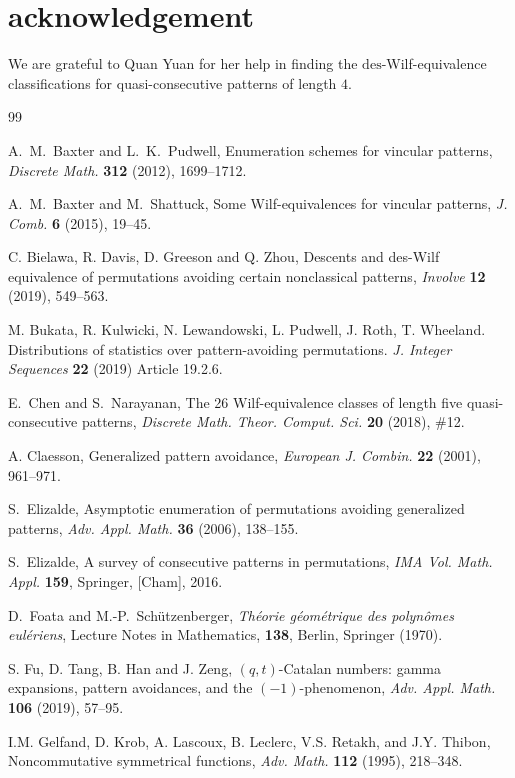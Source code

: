 \documentclass[11pt,reqno]{amsart}
\numberwithin{equation}{section}
\theoremstyle{plain}
\theoremstyle{definition}
\def\des{\mathrm{des}}
\begin{document}
\section*{acknowledgement}
We are grateful to Quan Yuan for her help in finding the $\des$-Wilf-equivalence classifications
for quasi-consecutive patterns of length $4$. 


\begin{thebibliography}{99}


     A.~M.~Baxter and L.~K.~Pudwell, Enumeration schemes for vincular patterns, {\em Discrete Math.} {\bf312} (2012), 1699--1712.

     A.~M.~Baxter and M.~Shattuck, Some Wilf-equivalences for vincular patterns, {\em J. Comb.} {\bf6} (2015), 19--45.

    C. Bielawa, R. Davis, D. Greeson and Q. Zhou, Descents and des-Wilf equivalence of permutations avoiding certain nonclassical patterns, {\em Involve} \textbf{12} (2019), 549--563. 

    M. Bukata, R. Kulwicki, N. Lewandowski, L. Pudwell, J. Roth, T.	Wheeland. Distributions of statistics over pattern-avoiding permutations. {\em J. Integer Sequences} {\bf 22} (2019) Article 19.2.6.

     E.~Chen and S.~Narayanan, The 26 Wilf-equivalence classes of length five quasi-consecutive patterns, {\em Discrete Math. Theor. Comput. Sci.} {\bf20} (2018), \#12.
    
    A. Claesson, Generalized pattern avoidance, {\em European J. Combin.} \textbf{22} (2001), 961--971.

     S.~Elizalde, Asymptotic enumeration of permutations avoiding generalized patterns, {\em Adv. Appl. Math.} {\bf36} (2006), 138--155.
    
     S.~Elizalde, A survey of consecutive patterns in permutations, {\em IMA Vol. Math. Appl.} {\bf 159}, Springer, [Cham], 2016. 


     D.~Foata and M.-P.~Sch\"utzenberger, {\it Th\'eorie g\'eom\'etrique des polyn\^omes eul\'eriens}, Lecture Notes in Mathematics, {\bf138}, Berlin, Springer (1970).

     S. Fu, D. Tang, B. Han and J. Zeng, $(q,t)$-Catalan numbers: gamma expansions, pattern avoidances, and the $(-1)$-phenomenon, {\em Adv. Appl. Math.} \textbf{106} (2019), 57--95.

   I.M. Gelfand, D. Krob, A. Lascoux, B. Leclerc, V.S. Retakh, and J.Y. Thibon, Noncommutative symmetrical functions, {\em Adv. Math.} \textbf{112} (1995), 218--348.


\end{thebibliography}
\end{document}
